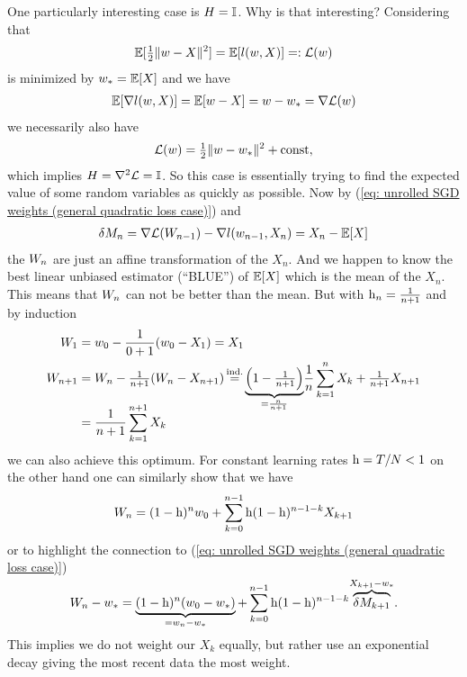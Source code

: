 One particularly interesting case is \(H=\mathbb{I}\). Why is that interesting?
Considering that
\begin{align*}
	\mathbb{E}[\tfrac12\|w-X\|^2]=\mathbb{E}[l(w,X)]=:\mathcal{L}(w)
\end{align*}
is minimized by \(w_*=\mathbb{E}[X]\) and we have
\begin{align*}
	\mathbb{E}[\nabla l(w,X)]
	=\mathbb{E}[w-X]=w- w_*=\nabla\mathcal{L}(w)
\end{align*}
we necessarily also have
\begin{align*}
	\mathcal{L}(w) = \tfrac12\|w-w_*\|^2 + \text{const},
\end{align*}
which implies \(H=\nabla^2\mathcal{L}=\mathbb{I}\). So this case is essentially
trying to find the expected value of some random variables as quickly as
possible. Now by (\ref{eq: unrolled SGD weights (general
quadratic loss case)}) and
\begin{align*}
	\delta M_n = \nabla\mathcal{L}(W_{n-1}) -\nabla l(w_{n-1}, X_n)
	= X_n - \mathbb{E}[X]
\end{align*}
the \(W_n\) are just an affine transformation of the \(X_n\). And we
happen to know the best linear unbiased estimator (``BLUE'') of \(\mathbb{E}[X]\)
which is the mean of the \(X_n\). This means that \(W_n\) can not be
better than the mean. But with \(\text{h}_n=\frac1{n+1}\) and by induction
\begin{align}
	\label{eq: getting rid of w_0 first step}
	\Weights_1 &= \weights_0 - \frac{1}{0+1}(\weights_0 - X_1) = X_1\\
	\label{eq: telescoping product}
	\Weights_{n+1}
	&= \Weights_n - \tfrac{1}{n+1}(\Weights_n - X_{n+1})
	\xeq{\text{ind.}}\smash{\underbrace{\left(1-\tfrac1{n+1}\right)}_{=\frac{n}{n+1}}}
	\frac1n\sum_{k=1}^n X_k + \tfrac{1}{n+1}X_{n+1}\\
	\nonumber
	&= \frac{1}{n+1}\sum_{k=1}^{n+1}X_k
\end{align}
we can also achieve this optimum. For constant learning rates \(\text{h}=T/N<1\) on the
other hand one can similarly show that we have
\begin{align*}
	W_n = (1-\text{h})^nw_0 + \sum_{k=0}^{n-1}\text{h}(1-\text{h})^{n-1-k}X_{k+1}
\end{align*}
or to highlight the connection to (\ref{eq: unrolled SGD weights (general
quadratic loss case)})
\begin{align*}
	W_n - w_*
	= \underbrace{(1-\text{h})^n(w_0 -w_*)}_{=w_n-w_*}
	+ \sum_{k=0}^{n-1}\text{h}(1-\text{h})^{n-1-k}
	\smash{\overbrace{\delta M_{k+1}}^{X_{k+1}-w_*}}.
\end{align*}
This implies we do not weight our \(X_k\) equally, but rather use an
exponential decay giving the most recent data the most weight.

